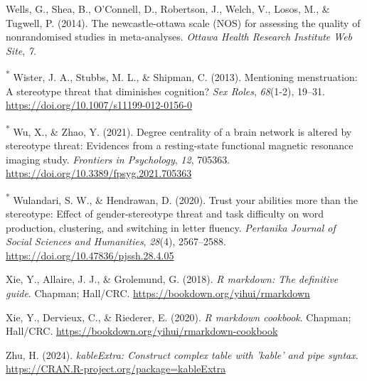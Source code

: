 \documentclass[
  stu,floatsintext]{apa7}
\newlength{\cslhangindent}
\newenvironment{CSLReferences}[2] %
 {\begin{list}{}{%
  \setlength{\itemindent}{0pt}
  \setlength{\leftmargin}{0pt}
  \setlength{\parsep}{0pt}
  \ifodd #1
   \setlength{\leftmargin}{\cslhangindent}
   \setlength{\itemindent}{-1\cslhangindent}
  \fi
  \setlength{\itemsep}{#2\baselineskip}}}
 {\end{list}}
\begin{document}
\begin{CSLReferences}{1}{0}
Wells, G., Shea, B., O'Connell, D., Robertson, J., Welch, V., Losos, M., \& Tugwell, P. (2014). The newcastle-ottawa scale ({NOS}) for assessing the quality of nonrandomised studies in meta-analyses. \emph{Ottawa Health Research Institute Web Site}, \emph{7}.

\textsuperscript{*} Wister, J. A., Stubbs, M. L., \& Shipman, C. (2013). Mentioning menstruation: A stereotype threat that diminishes cognition? \emph{Sex Roles}, \emph{68}(1-2), 19--31. \url{https://doi.org/10.1007/s11199-012-0156-0}

\textsuperscript{*} Wu, X., \& Zhao, Y. (2021). Degree centrality of a brain network is altered by stereotype threat: {Evidences} from a resting-state functional magnetic resonance imaging study. \emph{Frontiers in Psychology}, \emph{12}, 705363. \url{https://doi.org/10.3389/fpsyg.2021.705363}

\textsuperscript{*} Wulandari, S. W., \& Hendrawan, D. (2020). Trust your abilities more than the stereotype: {Effect} of gender-stereotype threat and task difficulty on word production, clustering, and switching in letter fluency. \emph{Pertanika Journal of Social Sciences and Humanities}, \emph{28}(4), 2567--2588. \url{https://doi.org/10.47836/pjssh.28.4.05}

Xie, Y., Allaire, J. J., \& Grolemund, G. (2018). \emph{R markdown: The definitive guide}. Chapman; Hall/CRC. \url{https://bookdown.org/yihui/rmarkdown}

Xie, Y., Dervieux, C., \& Riederer, E. (2020). \emph{R markdown cookbook}. Chapman; Hall/CRC. \url{https://bookdown.org/yihui/rmarkdown-cookbook}

Zhu, H. (2024). \emph{kableExtra: Construct complex table with 'kable' and pipe syntax}. \url{https://CRAN.R-project.org/package=kableExtra}

\end{CSLReferences}


\clearpage
\renewcommand{\listfigurename}{Figure captions}

\clearpage
\renewcommand{\listtablename}{Table captions}
\end{document}
